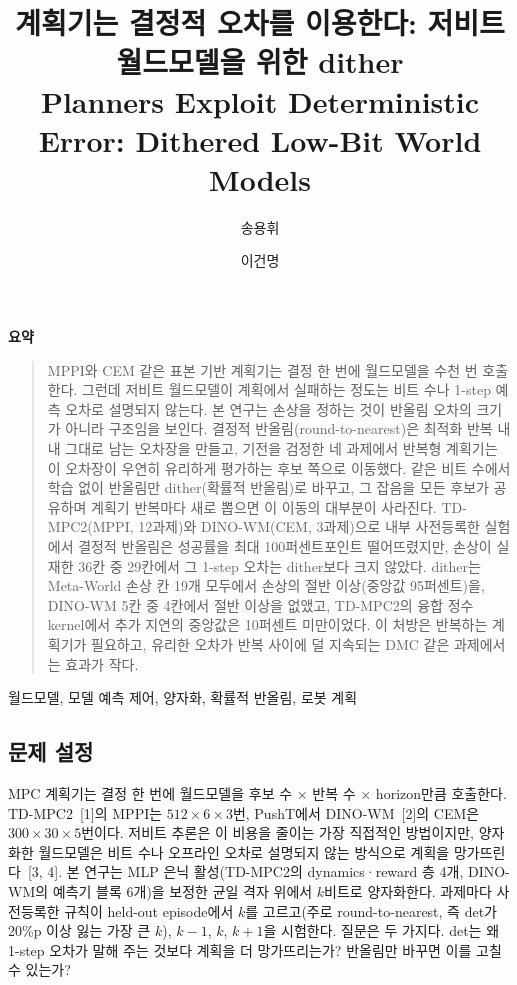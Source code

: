\documentclass[nouppercase]{kaia}
\title{계획기는 결정적 오차를 이용한다: 저비트 월드모델을 위한 dither\\[2pt]
{\normalsize\normalfont Planners Exploit Deterministic Error: Dithered Low-Bit World Models}}
\author{송용휘}{a}
\author{이건명}{b}
\affiliation{충북대학교 정보통신공학부, 대한민국, thddydgnl1937@gmail.com}{a}
\affiliation{충북대학교 소프트웨어학부, 대한민국, kmlee@cbnu.ac.kr}{b}
\newcommand{\dtm}{\textsf{det}}
\renewenvironment{abstract}{\center\textbf{\large{요약}}\par\vspace{0.5\baselineskip}\begin{quote}}{\end{quote}}  %
\begin{document}
\maketitle
\vspace{-28pt}

\begin{mdframed}

\begin{abstract}
MPPI와 CEM 같은 표본 기반 계획기는 결정 한 번에 월드모델을 수천 번 호출한다. 그런데 저비트 월드모델이 계획에서 실패하는 정도는 비트 수나 1-step 예측 오차로 설명되지 않는다. 본 연구는 손상을 정하는 것이 반올림 오차의 크기가 아니라 구조임을 보인다. 결정적 반올림(round-to-nearest)은 최적화 반복 내내 그대로 남는 오차장을 만들고, 기전을 검정한 네 과제에서 반복형 계획기는 이 오차장이 우연히 유리하게 평가하는 후보 쪽으로 이동했다. 같은 비트 수에서 학습 없이 반올림만 dither(확률적 반올림)로 바꾸고, 그 잡음을 모든 후보가 공유하며 계획기 반복마다 새로 뽑으면 이 이동의 대부분이 사라진다. TD-MPC2(MPPI, 12과제)와 DINO-WM(CEM, 3과제)으로 내부 사전등록한 실험에서 결정적 반올림은 성공률을 최대 100퍼센트포인트 떨어뜨렸지만, 손상이 실재한 36칸 중 29칸에서 그 1-step 오차는 dither보다 크지 않았다. dither는 Meta-World 손상 칸 19개 모두에서 손상의 절반 이상(중앙값 95퍼센트)을, DINO-WM 5칸 중 4칸에서 절반 이상을 없앴고, TD-MPC2의 융합 정수 kernel에서 추가 지연의 중앙값은 10퍼센트 미만이었다. 이 처방은 반복하는 계획기가 필요하고, 유리한 오차가 반복 사이에 덜 지속되는 DMC 같은 과제에서는 효과가 작다.
\end{abstract}
\begin{keywords}
월드모델, 모델 예측 제어, 양자화, 확률적 반올림, 로봇 계획
\end{keywords}

\subsection{문제 설정}
MPC 계획기는 결정 한 번에 월드모델을 후보 수 $\times$ 반복 수 $\times$ horizon만큼 호출한다. TD-MPC2~[1]의 MPPI는 $512\times6\times3$번, PushT에서 DINO-WM~[2]의 CEM은 $300\times30\times5$번이다. 저비트 추론은 이 비용을 줄이는 가장 직접적인 방법이지만, 양자화한 월드모델은 비트 수나 오프라인 오차로 설명되지 않는 방식으로 계획을 망가뜨린다~[3, 4]. 본 연구는 MLP 은닉 활성(TD-MPC2의 dynamics·reward 층 4개, DINO-WM의 예측기 블록 6개)을 보정한 균일 격자 위에서 $k$비트로 양자화한다. 과제마다 사전등록한 규칙이 held-out episode에서 $k$를 고르고(주로 round-to-nearest, 즉 \dtm{}가 20\%p 이상 잃는 가장 큰 $k$), $k-1$, $k$, $k+1$을 시험한다. 질문은 두 가지다. \dtm{}는 왜 1-step 오차가 말해 주는 것보다 계획을 더 망가뜨리는가? 반올림만 바꾸면 이를 고칠 수 있는가?


\end{mdframed}
\end{document}
